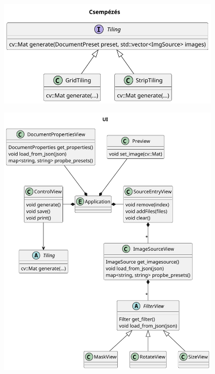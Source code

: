 \begin{figure}
    \centering
    \includegraphics[width=12cm]{figures/uml/tiling.pdf}
    \label{fig:Tiling_uml}
\end{figure}

\begin{figure}
    \centering
    \includegraphics[width=14cm]{figures/uml/ui.pdf}
    \label{fig:UI_uml}
\end{figure}
